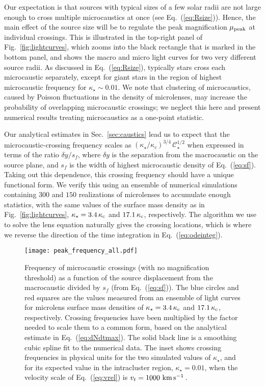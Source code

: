 \documentclass{aastex6}
\newcommand{\refeq}[1]{Eq.~(\ref{eq:#1})}
\newcommand{\reffig}[1]{Fig.~\ref{fig:#1}}
\newcommand{\refsec}[1]{Sec.~\ref{sec:#1}}
\def\kms{\, {\rm km}\, {\rm s}^{-1}\, }
\begin{document}
Our expectation is that sources with typical sizes of a few solar radii are not large enough to cross multiple microcaustics at once (see \refeq{Rsize}). Hence, the main effect of the source size will be to regulate the peak magnification $\mu_{\rm peak}$ at individual crossings. This is illustrated in the top-right panel of \reffig{lightcurves}, which zooms into the black rectangle that is marked in the bottom panel, and shows the macro and micro light curves for two very different source radii. As discussed in \refeq{Rsize}, typically stars cross each microcaustic separately, except for giant stars in the region of highest microcaustic frequency for $\kappa_\star\sim 0.01$. We note that clustering of microcaustics, caused by Poisson fluctuations in the density of microlenses, may increase the probability of overlapping microcaustic crossings; we neglect this here and present numerical results treating microcaustics as a one-point statistic.

Our analytical estimates in \refsec{caustics} lead us to expect that the microcaustic-crossing frequency scales as $(\kappa_\star/\kappa_c)^{3/4}\, \mathcal{C}_\star^{1/2}$ when expressed in terms of the ratio $\delta y/s_f$, where $\delta y$ is the separation from the macrocaustic on the source plane, and $s_f$ is the width of highest microcaustic density of \refeq{sf}. Taking out this dependence, this crossing frequency should have a unique functional form. We verify this using an ensemble of numerical simulations containing $300$ and $150$ realizations of microlenses to accumulate enough statistics, with the same values of the surface mass density as in \reffig{lightcurves}, $\kappa_\star = 3.4 \, \kappa_{\rm c}$ and $17.1 \, \kappa_{\rm c}$, respectively.
The algorithm we use to solve the lens equation naturally gives the crossing locations, which is where we reverse the direction of the time integration in \refeq{odeinteg}.

\begin{figure}[t]
\begin{center}
  \texttt{[image: peak\_frequency\_all.pdf]}
\caption{\label{fig:ccross_freq} Frequency of microcaustic crossings (with no magnification threshold) as a function of the source displacement from the macrocaustic divided by $s_f$ (from \refeq{sf}). The {\color{mlabblue} blue} circles and {\color{mlabred} red} squares are the values measured from an ensemble of light curves for microlens surface mass densities of $\kappa_\star = 3.4\, \kappa_{\rm c}$ and $17.1\, \kappa_{\rm c}$, respectively. Crossing frequencies have been multiplied by the factor needed to scale them to a common form, based on the analytical estimate in \refeq{dNdtmax}. The solid black line is a smoothing cubic spline fit to the numerical data. The inset shows crossing frequencies in physical units for the two simulated values of $\kappa_\star$, and for its expected value in the intracluster region, $\kappa_\star = 0.01$, when the velocity scale of \refeq{vrel} is $v_t = 1000 \, \kms$.}
\end{center}
\end{figure}
\end{document}

